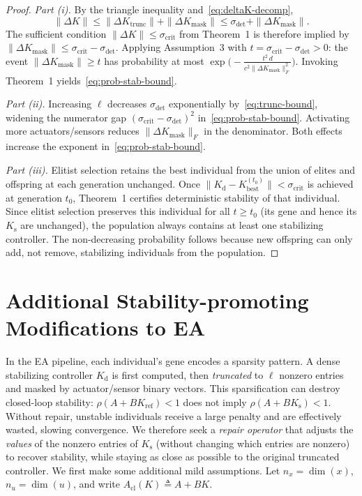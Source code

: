\documentclass[conference]{IEEEtran}
\begin{document}
\begin{proof}
\emph{Part (i).}
By the triangle inequality
and~\eqref{eq:deltaK-decomp},
\[
  \|\Delta K\|
  \le \|\Delta K_{\mathrm{trunc}}\|
      + \|\Delta K_{\mathrm{mask}}\|
  \le \sigma_{\mathrm{det}}
      + \|\Delta K_{\mathrm{mask}}\|.
\]
The sufficient condition
$\|\Delta K\| \le \sigma_{\mathrm{crit}}$ from
Theorem~1 is therefore implied by
$\|\Delta K_{\mathrm{mask}}\|
  \le \sigma_{\mathrm{crit}} - \sigma_{\mathrm{det}}$.
Applying Assumption~3 with
$t = \sigma_{\mathrm{crit}} - \sigma_{\mathrm{det}} > 0$:
the event
$\|\Delta K_{\mathrm{mask}}\| \ge t$ has probability at most
$\exp\!\bigl(-\frac{t^{2}\,d}{c^{2}
  \|\Delta K_{\mathrm{mask}}\|_{F}^{2}}\bigr)$.
Invoking Theorem~1 yields~\eqref{eq:prob-stab-bound}.

\emph{Part (ii).}
Increasing $\ell$ decreases
$\sigma_{\mathrm{det}}$ exponentially
by~\eqref{eq:trunc-bound}, widening the numerator gap
$(\sigma_{\mathrm{crit}} - \sigma_{\mathrm{det}})^{2}$
in~\eqref{eq:prob-stab-bound}.
Activating more actuators/sensors reduces
$\|\Delta K_{\mathrm{mask}}\|_{F}$ in the denominator.
Both effects increase the exponent
in~\eqref{eq:prob-stab-bound}.

\emph{Part (iii).}
Elitist selection retains the best individual from the union
of elites and offspring at each generation unchanged.
Once $\|K_{\mathrm{d}} - K^{(t_0)}_{\mathrm{best}}\|
  < \sigma_{\mathrm{crit}}$
is achieved at generation $t_0$, Theorem~1 certifies
deterministic stability of that individual.
Since elitist selection preserves this individual for all
$t \ge t_0$ (its gene and hence its $K_{\mathrm{s}}$ are
unchanged), the population always contains at least one
stabilizing controller.  The non-decreasing probability
follows because new offspring can only add, not remove,
stabilizing individuals from the population.
\end{proof}


\section{Additional Stability-promoting Modifications to EA}\label{subsec:gers_repair}

In the EA pipeline, each individual's gene encodes a sparsity pattern.  A dense stabilizing controller
$K_\mathrm{d}$ is first computed, then
\emph{truncated} to $\ell$ nonzero entries and masked by
actuator/sensor binary vectors.  This sparsification can destroy
closed-loop stability: $\rho(A+BK_{\mathrm{ref}})<1$ does not imply
$\rho(A+BK_{\mathrm{s}})<1$.  Without repair, unstable individuals
receive a large penalty and are effectively wasted, slowing
convergence.  We therefore seek a \emph{repair operator} that adjusts
the \emph{values} of the nonzero entries of $K_{\mathrm{s}}$ (without
changing which entries are nonzero) to recover stability, while staying
as close as possible to the original truncated controller. We first make some additional mild assumptions. 
Let $n_x=\dim(x)$, $n_u=\dim(u)$, and write
$A_{\mathrm{cl}}(K)\triangleq A+BK$.
\end{document}
